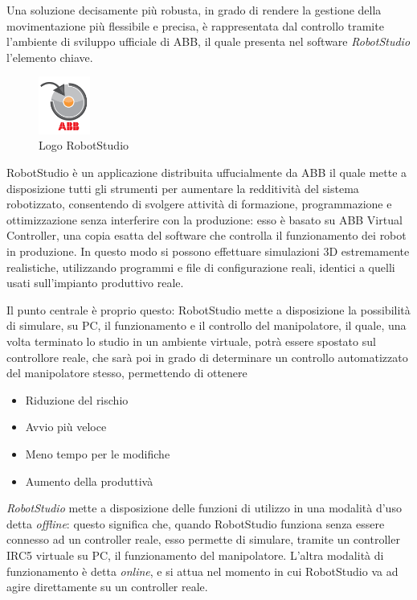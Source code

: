 \label{text:RobotStudio}Una soluzione decisamente più robusta, in grado di rendere la gestione della movimentazione più flessibile e precisa, è rappresentata dal controllo tramite l'ambiente di sviluppo ufficiale di ABB, il quale presenta nel software \emph{RobotStudio} l'elemento chiave.
\begin{figure}[h]
	\centering
	\includegraphics[width=0.15\textwidth]{Immagini/Logo_RobotStudio}
	\caption{Logo RobotStudio}
	\label{fig:Logo_RobotStudio}
\end{figure}

RobotStudio è un applicazione distribuita uffucialmente da ABB il quale mette a disposizione tutti gli strumenti per aumentare la redditività del sistema robotizzato, consentendo di svolgere attività di formazione, programmazione e ottimizzazione senza interferire con la produzione: esso è basato su ABB Virtual Controller, una copia esatta del software che controlla il funzionamento dei robot in produzione. In questo modo si possono effettuare simulazioni 3D estremamente realistiche, utilizzando programmi e file di configurazione reali, identici a quelli usati sull'impianto produttivo reale.

Il punto centrale è proprio questo: RobotStudio mette a disposizione la possibilità di simulare, su PC, il funzionamento e il controllo del manipolatore, il quale, una volta terminato lo studio in un ambiente virtuale, potrà essere spostato sul controllore reale, che sarà poi in grado di determinare un controllo automatizzato del manipolatore stesso, permettendo di ottenere
\begin{itemize}
	\item Riduzione del rischio
	\item Avvio più veloce
	\item Meno tempo per le modifiche
	\item Aumento della produttivà
\end{itemize}
\emph{RobotStudio} mette a disposizione delle funzioni di utilizzo in una modalità d'uso detta \emph{offline}: questo significa che, quando RobotStudio funziona senza essere connesso ad un controller reale, esso permette di simulare, tramite un controller IRC5 virtuale su PC, il funzionamento del manipolatore. L'altra modalità di funzionamento è detta \emph{online}, e si attua nel momento in cui RobotStudio va ad agire direttamente su un controller reale.

